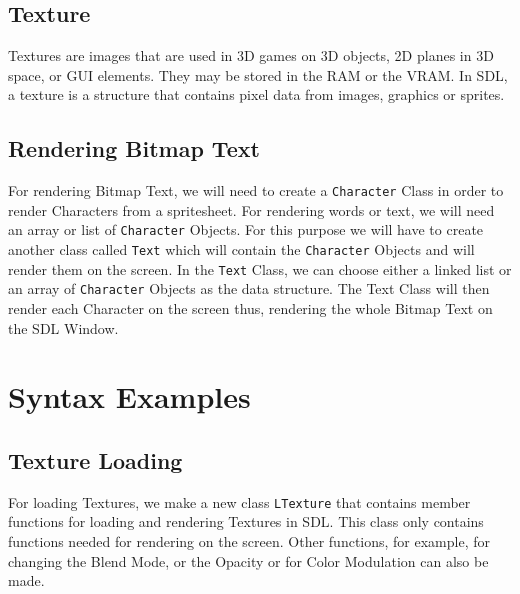 \documentclass[11pt,fleqn]{book} %
\begin{document}
\subsection{Texture}

Textures are images that are used in 3D games on 3D objects, 2D planes in 3D space, or GUI elements. They may be stored in the RAM or the VRAM. In SDL, a texture is a structure that contains pixel data from images, graphics or sprites. 

\subsection{Rendering Bitmap Text}

For rendering Bitmap Text, we will need to create a \texttt{Character} Class in order to render Characters from a spritesheet. For rendering words or text, we will need an array or list of \texttt{Character} Objects. For this purpose we will have to create another class called \texttt{Text} which will contain the \texttt{Character} Objects and will render them on the screen. In the \texttt{Text} Class, we can choose either a linked list or an array of \texttt{Character} Objects as the data structure. The Text Class will then render each Character on the screen thus, rendering the whole Bitmap Text on the SDL Window.

\section{Syntax Examples}

\subsection{Texture Loading}

For loading Textures, we make a new class \texttt{LTexture} that contains member functions for loading and rendering Textures in SDL. This class only contains functions needed for rendering on the screen. Other functions, for example, for changing the Blend Mode, or the Opacity or for Color Modulation can also be made.

\end{document}
